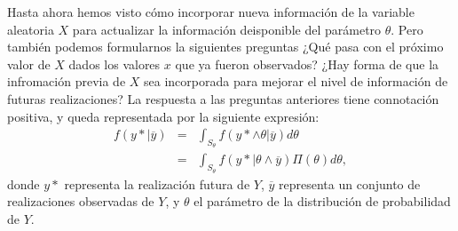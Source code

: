 Hasta ahora hemos visto cómo incorporar nueva información de la variable aleatoria $X$ para actualizar la información deisponible del parámetro $\theta$. Pero también podemos formularnos la siguientes preguntas ¿Qué pasa con el próximo valor de $X$ dados los valores $x$ que ya fueron observados? ¿Hay forma de que la infromación previa de $X$ sea incorporada para mejorar el nivel de información de futuras realizaciones? 
La respuesta a las preguntas anteriores tiene connotación positiva, y queda representada por la siguiente expresión:
\begin{eqnarray}
	f(y*|\overline{y})&=&\int_{S_{\theta}}f(y* \wedge \theta |\overline{y})d\theta\nonumber\\
	&=&\int_{S_{\theta}}f(y* | \theta \wedge \overline{y})\Pi(\theta) d\theta,
\end{eqnarray}  
donde $y*$ representa la realización futura de $Y$, $\overline{y}$ representa un conjunto de realizaciones
observadas de $Y$, y $\theta$ el parámetro de la distribución de probabilidad de $Y$.
